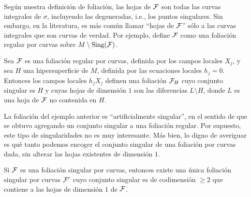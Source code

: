 \begin{remark}
Según nuestra definición de foliación, las hojas de $\mathcal F$ son todas las curvas integrales de $\sigma$, incluyendo las degeneradas, i.e., los puntos singulares. Sin embargo, en la literatura, es más común llamar ``hojas de $\mathcal F$'' sólo a las curvas integrales que son curvas de verdad. Por ejemplo, \cite[p. 96]{soares} define $\mathcal F$ como una foliación regular por curvas sobre $M \setminus \operatorname{Sing}(\mathcal F)$.
\end{remark}

\begin{example}
Sea $\mathcal F$ es una foliación regular por curvas, definida por los campos locales $X_j$, y sea $H$ una hipersuperficie de $M$, definida por las ecuaciones locales $h_j = 0$. Entonces los campos locales $h_j X_j$ definen una foliación $\mathcal F_H$ cuyo conjunto singular es $H$ y cuyas hojas de dimensión $1$ son las diferencias $L \setminus H$, donde $L$ es una hoja de $\mathcal F$ no contenida en $H$.
\end{example}

La foliación del ejemplo anterior es ``artificialmente singular'', en el sentido de que se obtuvo agregando un conjunto singular a una foliación regular. Por supuesto, este tipo de singularidades no es muy interesante. Más bien, lo digno de averiguar es qué tanto podemos encoger el conjunto singular de una foliación por curvas dada, sin alterar las hojas existentes de dimensión $1$.

\begin{proposition}
\label{divisor}
Si $\mathcal F$ es una foliación singular por curvas, entonces existe una única foliación singular por curvas $\mathcal F'$ cuyo conjunto singular es de codimensión $\ge 2$ que contiene a las hojas de dimensión $1$ de $\mathcal F$.
\end{proposition}

